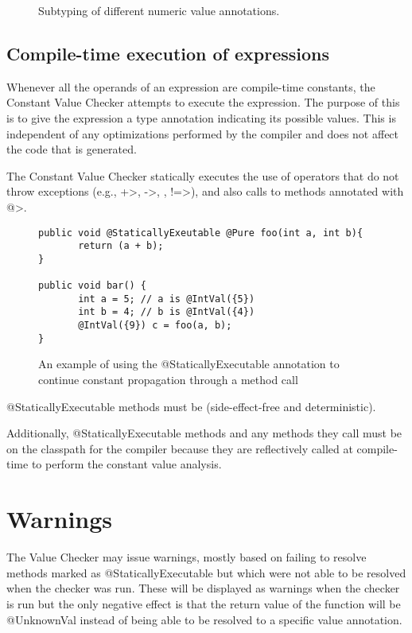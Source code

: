 \begin{figure}
\caption{Subtyping of different numeric value annotations.}
\label{fig-value-subtyping}
\end{figure}

\subsection{Compile-time execution of expressions\label{staticallyexecutable-annotation}}

Whenever all the operands of an expression are compile-time constants, the
Constant Value Checker attempts to execute the expression.  The purpose of
this is to give the expression a type annotation indicating its possible
values.  This is independent of any optimizations performed by the compiler
and does not affect the code that is generated.

The Constant Value Checker statically executes the use of operators that do
not throw exceptions (e.g., \<+>, \<->, \code{<\relax<}, \<!=>), and also
calls to methods annotated with
\<@>.

\begin{figure}
\begin{Verbatim}
public void @StaticallyExeutable @Pure foo(int a, int b){
       return (a + b);
}

public void bar() {
       int a = 5; // a is @IntVal({5})
       int b = 4; // b is @IntVal({4})
       @IntVal({9}) c = foo(a, b); 
}
\end{Verbatim}
\caption{An example of using the @StaticallyExecutable annotation to
       continue constant propagation through a method call}
\label{fig-value-multivalue}
\end{figure}

@StaticallyExecutable methods must
be  (side-effect-free and
deterministic).

Additionally, @StaticallyExecutable methods and any methods they call must be on
the classpath for the compiler because they are reflectively called at
compile-time to perform the constant value analysis.


\section{Warnings\label{value-checker-warnings}}

The Value Checker may issue warnings, mostly based on failing to
resolve methods marked as @StaticallyExecutable but which were not able to be
resolved when the checker was run. These will be displayed as warnings when
the checker is run but the only negative effect is that the return
value of the function will be @UnknownVal instead of being able to be
resolved to a specific value annotation.


